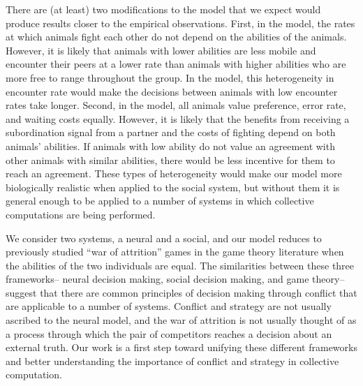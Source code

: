 \documentclass{article}
\begin{document}
There are (at least) two modifications to the model that we expect would produce results closer to the empirical observations.  First, in the model, the rates at which animals fight each other do not depend on the abilities of the animals.  However, it is likely that animals with lower abilities are less mobile and encounter their peers at a lower rate than animals with higher abilities who are more free to range throughout the group.  In the model, this heterogeneity in encounter rate would make the decisions between animals with low encounter rates take longer.  Second, in the model, all animals value preference, error rate, and waiting costs equally.  However, it is likely that the benefits from receiving a subordination signal from a partner and the costs of fighting depend on both animals' abilities.  If animals with low ability  do not value an agreement with other animals with similar abilities, there would be less incentive for them to reach an agreement.  These types of heterogeneity would make our model more biologically realistic when applied to the social system, but without them it is general enough to be applied to a number of systems in which collective computations are being performed.  

We consider two systems, a neural and a social, and our model reduces to previously studied ``war of attrition'' games in the game theory literature when the abilities of the two individuals are equal.  The similarities between these three frameworks-- neural decision making, social decision making, and game theory-- suggest that there are common principles of decision making through conflict that are applicable to a number of systems. Conflict and strategy are not usually ascribed to the neural model, and the war of attrition is not usually thought of as a process through which the pair of competitors reaches a decision about an external truth.  Our work is a first step toward unifying these different frameworks and better understanding the importance of conflict and strategy in collective computation.
\end{document}
